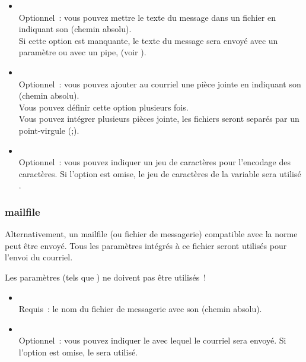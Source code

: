 \begin {itemize}
  \item [\var{-B},]  
    \\Optionnel~: vous pouvez mettre le texte du message dans un fichier
	en indiquant son (chemin absolu).
	\\Si cette option est manquante, le texte du message sera envoyé avec un paramètre
	ou avec un pipe, (voir ).

  \item [\var{-a},]  
    \\Optionnel~: vous pouvez ajouter au courriel une pièce jointe en indiquant
	son (chemin absolu).
	\\Vous pouvez définir cette option plusieurs fois.
	\\Vous pouvez intégrer plusieurs pièces jointe, les fichiers seront separés
	par un point-virgule (;).

  \item [\var{-C},]  
    \\Optionnel~: vous pouvez indiquer un jeu de caractères pour l'encodage
	des caractères. Si l'option est omise, le jeu de caractères de la variable
	 sera utilisé .
\end{itemize}

\subsubsection{ mailfile}

	Alternativement, un mailfile (ou fichier de messagerie) compatible avec la norme
	 peut être envoyé. Tous les paramètres intégrés à
	ce fichier seront utilisés pour l'envoi du courriel.

	Les paramètres (tels que ) ne doivent pas être utilisés~!

\begin {itemize}
  \item [\var{-m},]  
    \\Requis~: le nom du fichier de messagerie avec son (chemin absolu).

  \item [\var{-A},]  
    \\Optionnel~: vous pouvez indiquer le 
	avec lequel le courriel sera envoyé. Si l'option est omise,
	le   sera utilisé.

\end{itemize}
